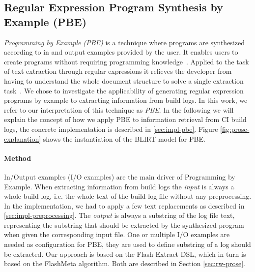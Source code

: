 \documentclass[\myrootdir/main.tex]{subfiles}
\begin{document}
\subsection{Regular Expression Program Synthesis by Example (PBE)}
\label{sec:expl-pbe}

\emph{Programming by Example (PBE)} is a technique where programs are synthesized according to in and output examples provided by the user.
It enables users to create programs without requiring programming knowledge~\cite{mayer2015user}.
Applied to the task of text extraction through regular expressions it relieves the developer from having to understand the whole document structure to solve a single extraction task~\cite{le2014flashextract:}.
We chose to investigate the applicability of generating regular expression programs by example to extracting information from build logs.
In this work, we refer to our interpretation of this technique as \emph{PBE}.
In the following we will explain the concept of how we apply PBE to information retrieval from CI build logs, the concrete implementation is described in \ref{sec:impl-pbe}.
Figure \ref{fig:prose-explanation} shows the instantiation of the BLIRT model for PBE.

\paragraph{Method}
In/Output examples (I/O examples) are the main driver of Programming by Example.
When extracting information from build logs the \emph{input} is always a whole build log, i.e. the whole text of the build log file without any preprocessing.
In the implementation, we had to apply a few text replacements as described in \ref{sec:impl-preprocessing}.
The \emph{output} is always a substring of the log file text, representing the substring that should be extracted by the synthesized program when given the corresponding input file.
One or multiple I/O examples are needed as configuration for PBE, they are used to define substring of a log should be extracted.
Our approach is based on the Flash Extract DSL, which in turn is based on the FlashMeta algorithm.
Both are described in Section \ref{sec:rw-prose}.

\end{document}

